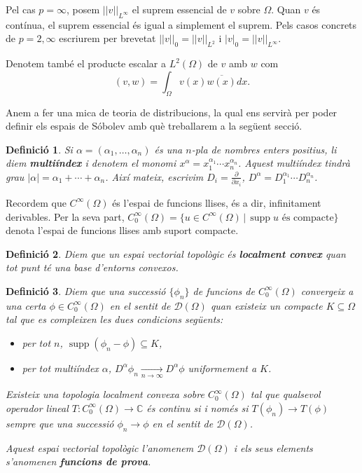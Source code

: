 \documentclass{article}
\numberwithin{equation}{section}
\DeclareMathOperator{\supp}{supp}
\newtheorem{definicio}{Definici\'{o}}[section]
\begin{document}
Pel cas $p=\infty$, posem $||v||_{L^{\infty}}$ el suprem essencial de $v$ sobre $\Omega$. Quan $v$ \'{e}s cont\'{i}nua, el suprem essencial \'{e}s igual a simplement el suprem. Pels casos concrets de $p=2,\infty$ escriurem per brevetat $||v||_0=||v||_{L^2}$ i $|v|_0=||v||_{L^{\infty}}$.

Denotem tamb\'{e} el producte escalar a $L^2(\Omega)$ de $v$ amb $w$ com
\begin{equation}
(v,w)=\int_{\Omega}v(x)\overline{w(x)}dx.
\end{equation}

Anem a fer una mica de teoria de distribucions, la qual ens servir\`{a} per poder definir els espais de S\'{o}bolev amb qu\`{e} treballarem a la seg\"{u}ent secci\'{o}.

\begin{definicio}
Si $\alpha=(\alpha_1,\ldots,\alpha_n)$ \'{e}s una $n$-pla de nombres enters positius, li diem \textbf{multi\'{i}ndex} i denotem el monomi $x^{\alpha}=x_1^{\alpha_1}\cdots x_n^{\alpha_n}$. Aquest multi\'{i}ndex tindr\`{a} grau $|\alpha|=\alpha_1+\cdots+\alpha_n$. Aix\'{i} mateix, escrivim $D_i=\frac{\partial}{\partial x_i}$, $D^{\alpha}=D_1^{\alpha_1}\cdots D_n^{\alpha_n}$.
\end{definicio}

Recordem que $C^{\infty}(\Omega)$ \'{e}s l'espai de funcions llises, \'{e}s a dir, infinitament derivables. Per la seva part, $C_0^{\infty}(\Omega)=\{u\in C^{\infty}(\Omega)\,|\,\supp u\text{ \'{e}s compacte}\}$ denota l'espai de funcions llises amb suport compacte.

\begin{definicio}
Diem que un espai vectorial topol\`{o}gic \'{e}s \textbf{localment convex} quan tot punt t\'{e} una base d'entorns convexos.
\end{definicio}

\begin{definicio}
Diem que una successi\'{o} $\{\phi_n\}$ de funcions de $C_0^{\infty}(\Omega)$ convergeix a una certa $\phi\in C_0^{\infty}(\Omega)$ en el sentit de $\mathcal{D}(\Omega)$ quan existeix un compacte $K\subseteq\Omega$ tal que es compleixen les dues condicions seg\"{u}ents:
\begin{itemize}
\item per tot $n$, $\supp(\phi_n-\phi)\subseteq K$,
\item per tot multi\'{i}ndex $\alpha$, $D^{\alpha}\phi_n\xrightarrow[n\to\infty]{}D^{\alpha}\phi$ uniformement a $K$.
\end{itemize}

Existeix una topologia localment convexa sobre $C_0^{\infty}(\Omega)$ tal que qualsevol operador lineal $T:C_0^{\infty}(\Omega)\rightarrow\mathbb{C}$ \'{e}s continu si i nom\'{e}s si $T(\phi_n)\rightarrow T(\phi)$ sempre que una successi\'{o} $\phi_n\rightarrow\phi$ en el sentit de $\mathcal{D}(\Omega)$.

Aquest espai vectorial topol\`{o}gic l'anomenem $\mathcal{D}(\Omega)$ i els seus elements s'anomenen \textbf{funcions de prova}.
\end{definicio}
\end{document}
